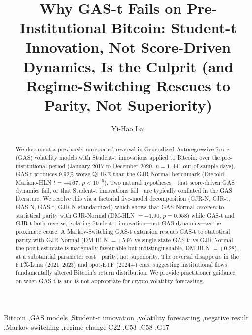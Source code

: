 \documentclass[review,authoryear,12pt]{elsarticle}
\begin{document}
\begin{frontmatter}

\title{Why GAS-t Fails on Pre-Institutional Bitcoin: Student-t Innovation, Not Score-Driven Dynamics, Is the Culprit (and Regime-Switching Rescues to Parity, Not Superiority)}

\author{Yi-Hao Lai}
\address{Department of Finance, Da-Yeh University, Changhua, Taiwan}

\begin{abstract}
\noindent
We document a previously unreported reversal in Generalized Autoregressive
Score (GAS) volatility models with Student-t innovations applied to Bitcoin:
over the pre-institutional period (January 2017 to December 2020, $n=1{,}441$
out-of-sample days), GAS-t produces 9.92\% worse QLIKE than the GJR-Normal
benchmark (Diebold-Mariano-HLN $t = -4.67$, $p < 10^{-5}$). Two natural
hypotheses---that score-driven GAS dynamics fail, or that Student-t
innovations fail---are typically conflated in the GAS literature. We resolve
this via a factorial five-model decomposition (GJR-N, GJR-t, GAS-N, GAS-t,
GJR-N-standardized) which shows that GAS-Normal \emph{recovers} to statistical
parity with GJR-Normal (DM-HLN $= -1.90$, $p = 0.058$) while GAS-t and GJR-t
both reverse, isolating Student-t innovation---not GAS dynamics---as the
proximate cause. A Markov-Switching GAS-t extension rescues GAS-t to
statistical parity with GJR-Normal (DM-HLN $= +5.97$ vs single-state GAS-t;
vs GJR-Normal the point estimate is marginally favourable but indistinguishable,
DM-HLN $= +0.28$), at a substantial parameter cost---parity, not superiority.
The reversal disappears in the FTX-Luna (2021--2023) and spot-ETF (2024+) eras,
suggesting institutional flows fundamentally altered Bitcoin's return
distribution. We provide practitioner guidance on when GAS-t is and is not
appropriate for crypto volatility forecasting.
\end{abstract}

\begin{keyword}
Bitcoin \sep GAS models \sep Student-t innovation \sep volatility forecasting \sep negative result \sep Markov-switching \sep regime change
\JEL C22 \sep C53 \sep C58 \sep G17
\end{keyword}

\end{frontmatter}





\end{document}
